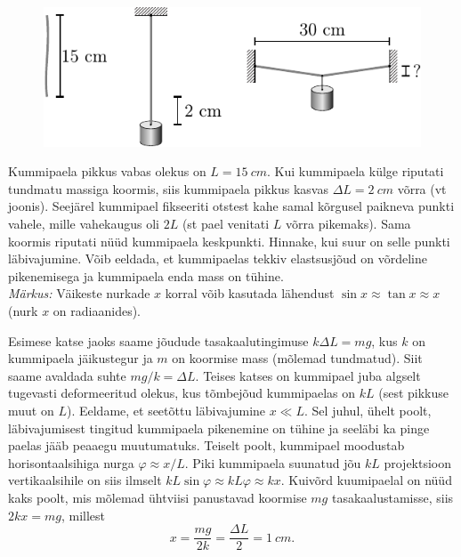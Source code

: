 
\begin{figure}
    \begin{center}
        \vspace{5pt}
        \includegraphics[width=\linewidth]{2023-lahg-03-yl.pdf}
    \end{center}
\end{figure}


Kummipaela pikkus vabas olekus on $L=\SI{15}{cm}$. Kui kummipaela külge riputati tundmatu massiga koormis, siis kummipaela pikkus kasvas $\Delta L=\SI{2}{cm}$ võrra (vt joonis). Seejärel kummipael fikseeriti otstest kahe samal kõrgusel paikneva punkti vahele, mille vahekaugus oli $2L$ (st pael venitati $L$ võrra pikemaks). Sama koormis riputati nüüd kummipaela keskpunkti. Hinnake, kui suur on selle punkti läbivajumine. Võib eeldada, et kummipaelas tekkiv elastsusjõud on võrdeline pikenemisega ja kummipaela enda mass on tühine.\\ \emph{Märkus:} Väikeste nurkade $x$ korral võib kasutada lähendust $\sin{x} \approx \tan{x} \approx x$ (nurk $x$ on radiaanides).










\hint

\solu
Esimese katse jaoks saame jõudude tasakaalutingimuse $k\Delta L=mg$, kus $k$ on kummipaela jäikustegur ja $m$ on koormise mass (mõlemad tundmatud). Siit saame avaldada suhte $mg/k=\Delta L$. Teises katses on kummipael juba algselt tugevasti deformeeritud olekus, kus tõmbejõud kummipaelas on $kL$ (sest pikkuse muut on $L$). Eeldame, et seetõttu läbivajumine $x\ll L$. Sel juhul, ühelt poolt, läbivajumisest tingitud kummipaela pikenemine on tühine ja seeläbi ka pinge paelas jääb peaaegu muutumatuks. Teiselt poolt, kummipael moodustab horisontaalsihiga nurga $\varphi\approx x/L$. Piki kummipaela suunatud jõu $kL$ projektsioon vertikaalsihile on siis ilmselt $kL\sin\varphi\approx kL\varphi\approx kx$. Kuivõrd kuumipaelal on nüüd kaks poolt, mis mõlemad ühtviisi panustavad koormise $mg$ tasakaalustamisse, siis $2kx=mg$, millest
\[
x =\frac{mg}{2k} =\frac{\Delta L}{2} = \SI{1}{cm}.
\]
\probend